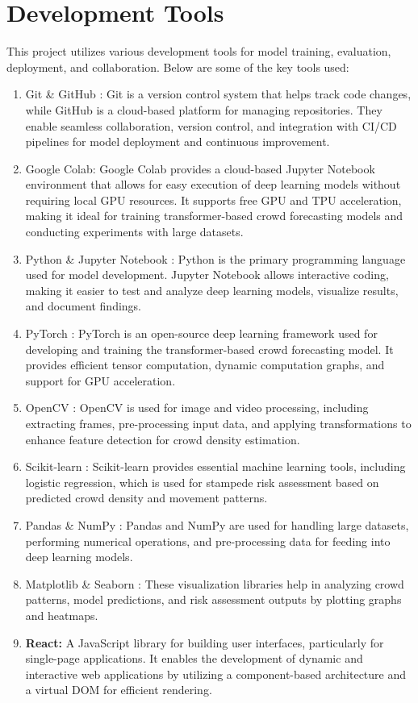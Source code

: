 \documentclass[11pt]{report}
\begin{document}
\section{Development Tools}
This project utilizes various development tools for model training, evaluation, deployment, and collaboration. Below are some of the key tools used:

\begin{enumerate}
    \item Git \& GitHub : Git is a version control system that helps track code changes, while GitHub is a cloud-based platform for managing repositories. They enable seamless collaboration, version control, and integration with CI/CD pipelines for model deployment and continuous improvement.
    \item Google Colab: Google Colab provides a cloud-based Jupyter Notebook environment that allows for easy execution of deep learning models without requiring local GPU resources. It supports free GPU and TPU acceleration, making it ideal for training transformer-based crowd forecasting models and conducting experiments with large datasets.
    \item Python \& Jupyter Notebook : Python is the primary programming language used for model development. Jupyter Notebook allows interactive coding, making it easier to test and analyze deep learning models, visualize results, and document findings.
    \item PyTorch : PyTorch is an open-source deep learning framework used for developing and training the transformer-based crowd forecasting model. It provides efficient tensor computation, dynamic computation graphs, and support for GPU acceleration.
    \item OpenCV : OpenCV is used for image and video processing, including extracting frames, pre-processing input data, and applying transformations to enhance feature detection for crowd density estimation.
    \item Scikit-learn : Scikit-learn provides essential machine learning tools, including logistic regression, which is used for stampede risk assessment based on predicted crowd density and movement patterns.
    \item Pandas \& NumPy : Pandas and NumPy are used for handling large datasets, performing numerical operations, and pre-processing data for feeding into deep learning models.
    \item Matplotlib \& Seaborn : These visualization libraries help in analyzing crowd patterns, model predictions, and risk assessment outputs by plotting graphs and heatmaps.
    \item \textbf{React:} A JavaScript library for building user interfaces, particularly for single-page applications. It enables the development of dynamic and interactive web applications by utilizing a component-based architecture and a virtual DOM for efficient rendering.
\end{enumerate}
\end{document}
